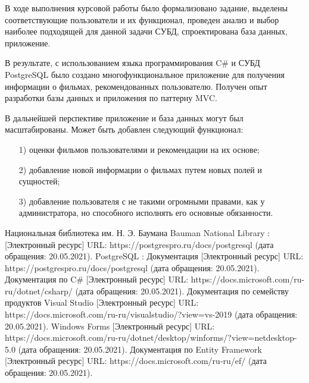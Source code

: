 В ходе выполнения курсовой работы было формализовано задание, выделены соответствующие пользователи и их функционал, проведен анализ и выбор наиболее подходящей для данной задачи СУБД, спроектирована база данных, приложение.

В результате, с использованием языка программирования C\# и СУБД PostgreSQL было создано многофункциональное приложение  для получения информации о фильмах, рекомендованных пользователю. Получен опыт разработки базы данных и приложения по паттерну MVC. 

В дальнейшей перспективе приложение и база данных могут был масштабированы. Может быть добавлен следующий функционал:
\begin{itemize}
	\item[1)] оценки фильмов пользователями и рекомендации на их основе;
	\item[2)] добавление новой информации о фильмах путем новых полей и сущностей;
	\item[3)] добавление пользователя с не такими огромными правами, как у администратора, но способного исполнять его основные обязанности.
\end{itemize}

\clearpage
\begin{thebibliography}{9}
	 Национальная библиотека им. Н. Э. Баумана Bauman National Library : [Электронный ресурс] URL: https://postgrespro.ru/docs/postgresql (дата обращения: 20.05.2021).
	 PostgreSQL : Документация [Электронный ресурс] URL: https://postgrespro.ru/docs/postgresql (дата обращения: 20.05.2021).
	 Документация по C\# [Электронный ресурс] URL: https://docs.microsoft.com/ru-ru/dotnet/csharp/ (дата обращения: 20.05.2021).
	 Документация по семейству продуктов Visual Studio [Электронный ресурс] URL: https://docs.microsoft.com/ru-ru/visualstudio/?view=vs-2019 (дата обращения: 20.05.2021).
	 Windows Forms [Электронный ресурс] URL: https://docs.microsoft.com/ru-ru/dotnet/desktop/winforms/?view=netdesktop-5.0 (дата обращения: 20.05.2021).
	 Документация по Entity Framework [Электронный ресурс] URL: https://docs.microsoft.com/ru-ru/ef/ (дата обращения: 20.05.2021).
\end{thebibliography}
 
